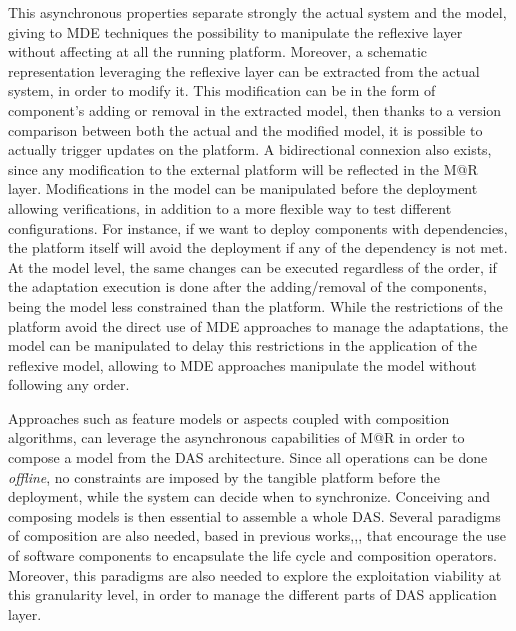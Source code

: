 This asynchronous properties separate strongly the actual system and the model, giving to MDE techniques the possibility to manipulate the reflexive layer without affecting at all the running platform.
Moreover, a schematic representation leveraging the reflexive layer can be extracted from the actual system, in order to modify it.
This modification can be in the form of component's adding or removal in the extracted model, then thanks to a version comparison between both the actual and the modified model, it is possible to actually trigger updates on the platform.
A bidirectional connexion also exists, since any modification to the external platform will be reflected in the M@R layer.
Modifications in the model can be manipulated before the deployment allowing verifications, in addition to a more flexible way to test different configurations.
For instance, if we want to deploy components with dependencies, the platform itself will avoid the deployment if any of the dependency is not met.
At the model level, the same changes can be executed regardless of the order, if the adaptation execution is done after the adding/removal of the components, being the model less constrained than the platform.
While the restrictions of the platform avoid the direct use of MDE approaches to manage the adaptations, the model can be manipulated to delay this restrictions in the application of the reflexive model, allowing to MDE approaches manipulate the model without following any order.

Approaches such as feature models or aspects\cite{morin2009taming} coupled with composition algorithms, can leverage the asynchronous capabilities of M@R in order to compose a model from the DAS architecture.
Since all operations can be done \textit{offline}, no constraints are imposed by the tangible platform before the deployment, while the system can decide when to synchronize.
Conceiving and composing models is then essential to assemble a whole DAS.
Several paradigms of composition are also needed, based in previous works\cite{morin2009mar},\cite{ko2012low},\cite{rouvoy2009music}, that encourage the use of software components to encapsulate the life cycle and composition operators.
Moreover, this paradigms are also needed to explore the exploitation viability at this granularity level, in order to manage the different parts of DAS application layer. 


